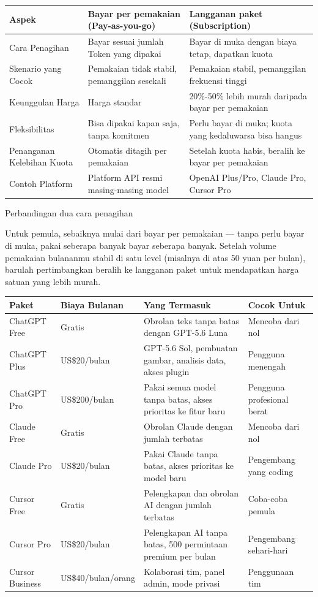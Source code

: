 
\begin{center}
\begin{tabularx}{\linewidth}{|X|X|X|}
\hline
\textbf{Aspek} & \textbf{Bayar per pemakaian (Pay-as-you-go)} & \textbf{Langganan paket (Subscription)} \tabularnewline
\hline
Cara Penagihan & Bayar sesuai jumlah Token yang dipakai & Bayar di muka dengan biaya tetap, dapatkan kuota \tabularnewline
Skenario yang Cocok & Pemakaian tidak stabil, pemanggilan sesekali & Pemakaian stabil, pemanggilan frekuensi tinggi \tabularnewline
Keunggulan Harga & Harga standar & 20\%-50\% lebih murah daripada bayar per pemakaian \tabularnewline
Fleksibilitas & Bisa dipakai kapan saja, tanpa komitmen & Perlu bayar di muka; kuota yang kedaluwarsa bisa hangus \tabularnewline
Penanganan Kelebihan Kuota & Otomatis ditagih per pemakaian & Setelah kuota habis, beralih ke bayar per pemakaian \tabularnewline
Contoh Platform & Platform API resmi masing-masing model & OpenAI Plus/Pro, Claude Pro, Cursor Pro \tabularnewline
\hline
\end{tabularx}
\end{center}

\begin{center}\small\color{gray}Perbandingan dua cara penagihan\end{center}

Untuk pemula, sebaiknya mulai dari bayar per pemakaian — tanpa perlu bayar di muka, pakai seberapa banyak bayar seberapa banyak. Setelah volume pemakaian bulananmu stabil di satu level (misalnya di atas 50 yuan per bulan), barulah pertimbangkan beralih ke langganan paket untuk mendapatkan harga satuan yang lebih murah.


\begin{center}
\begin{tabularx}{\linewidth}{|X|X|X|X|}
\hline
\textbf{Paket} & \textbf{Biaya Bulanan} & \textbf{Yang Termasuk} & \textbf{Cocok Untuk} \tabularnewline
\hline
ChatGPT Free & Gratis & Obrolan teks tanpa batas dengan GPT-5.6 Luna & Mencoba dari nol \tabularnewline
ChatGPT Plus & US\$20/bulan & GPT-5.6 Sol, pembuatan gambar, analisis data, akses plugin & Pengguna menengah \tabularnewline
ChatGPT Pro & US\$200/bulan & Pakai semua model tanpa batas, akses prioritas ke fitur baru & Pengguna profesional berat \tabularnewline
Claude Free & Gratis & Obrolan Claude dengan jumlah terbatas & Mencoba dari nol \tabularnewline
Claude Pro & US\$20/bulan & Pakai Claude tanpa batas, akses prioritas ke model baru & Pengembang yang coding \tabularnewline
Cursor Free & Gratis & Pelengkapan dan obrolan AI dengan jumlah terbatas & Coba-coba pemula \tabularnewline
Cursor Pro & US\$20/bulan & Pelengkapan AI tanpa batas, 500 permintaan premium per bulan & Pengembang sehari-hari \tabularnewline
Cursor Business & US\$40/bulan/orang & Kolaborasi tim, panel admin, mode privasi & Penggunaan tim \tabularnewline
\hline
\end{tabularx}
\end{center}

